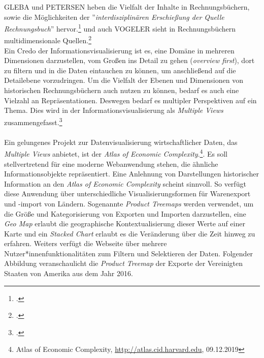 \documentclass[12pt,a4paper]{article}
\begin{document}
GLEBA und PETERSEN heben die Vielfalt der Inhalte in Rechnungsbüchern, sowie die Möglichkeiten der ''\textit{interdisziplinären Erschießung der Quelle Rechnungsbuch}'' hervor.\footcite[][S.7-10]{gleba2015wirtschafts} und auch VOGELER sieht in Rechnungsbüchern multidimensionale Quellen.\footcite[][]{vogeler2016content}
\\
Ein Credo der Informationsvisualisierung ist es, eine Domäne in mehreren Dimensionen darzustellen, vom Großen ins Detail zu gehen (\textit{overview first}), dort zu filtern und in die Daten eintauchen zu können, um anschließend auf die Detailebene vorzudringen. Um die Vielfalt der Ebenen und Dimensionen von historischen Rechnungsbüchern auch nutzen zu können, bedarf es auch eine Vielzahl an Repräsentationen. Deswegen bedarf es multipler Perspektiven auf ein Thema. Dies wird in der Informationsvisualisierung als \textit{Multiple Views} zusammengefasst.\footcite[][S.452-462]{preim2010interaktive}
\\
\\
Ein gelungenes Projekt zur Datenvisualisierung wirtschaftlicher Daten, das \textit{Multiple Views} anbietet, ist  der \textit{Atlas of Economic Complexity}.\footnote{Atlas of Economic Complexity, \url{http://atlas.cid.harvard.edu}, 09.12.2019}. Es soll stellvertretend für eine moderne Webanwendung stehen, die ähnliche Informationsobjekte repräsentiert. Eine Anlehnung von Darstellungen historischer Information an den \textit{Atlas of Economic Complexity} scheint sinnvoll. So verfügt diese Anwendung über unterschiedliche Visualisierungsformen für Warenexport und -import von Ländern. Sogenannte \textit{Product Treemaps} werden verwendet, um die Größe und Kategorisierung von Exporten und Importen darzustellen, eine \textit{Geo Map} erlaubt die geographische Kontextualisierung dieser Werte auf einer Karte und ein \textit{Stacked Chart} erlaubt es die Veränderung über die Zeit hinweg zu erfahren. Weiters verfügt die Webseite über mehrere Nutzer*innenfunktionalitäten zum Filtern und Selektieren der Daten. Folgender Abbildung veranschaulicht die \textit{Product Treemap} der Exporte der Vereinigten Staaten von Amerika aus dem Jahr 2016.
\end{document}
